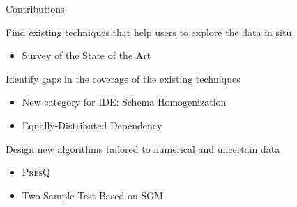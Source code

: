 \documentclass[10pt,notes]{beamer}
\newcommand{\PresQ}[0]{\textsc{PresQ}\xspace}
\begin{document}




\begin{frame}{Contributions}

\begin{alertblock}{ Find existing techniques that help users to explore the data in situ}
    \begin{itemize}
        \item Survey of the State of the Art
    \end{itemize}
\end{alertblock}

\begin{alertblock}{ Identify gaps in the coverage of the existing techniques}
    \begin{itemize}
        \item New category for IDE: \alert{Schema Homogenization}
        \item Equally-Distributed Dependency
    \end{itemize}
\end{alertblock}

\begin{alertblock}{ Design new algorithms tailored to numerical and uncertain data}
    \begin{itemize}
        \item \PresQ
        \item Two-Sample Test Based on SOM
    \end{itemize}
\end{alertblock}

\end{frame}
\end{document}
